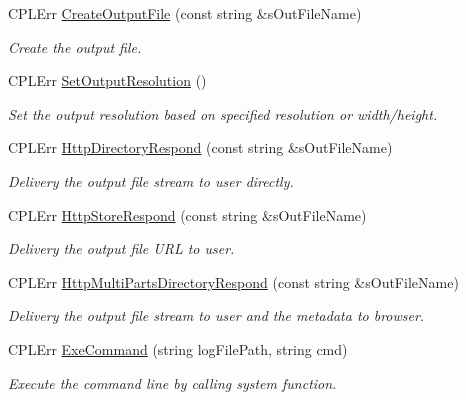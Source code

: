 \begin{DoxyCompactItemize}
\item 
CPLErr \hyperlink{classWCS__GetCoverage_a38ebb99c11736874a5fdf9898aa3ce7f}{CreateOutputFile} (const string \&sOutFileName)
\begin{DoxyCompactList}\small\item\em Create the output file. \end{DoxyCompactList}\item 
CPLErr \hyperlink{classWCS__GetCoverage_a32d3c6edbb677534e0036c4acb6a327c}{SetOutputResolution} ()
\begin{DoxyCompactList}\small\item\em Set the output resolution based on specified resolution or width/height. \end{DoxyCompactList}\item 
CPLErr \hyperlink{classWCS__GetCoverage_a890b915a63bc56d6057981527d3f680e}{HttpDirectoryRespond} (const string \&sOutFileName)
\begin{DoxyCompactList}\small\item\em Delivery the output file stream to user directly. \end{DoxyCompactList}\item 
CPLErr \hyperlink{classWCS__GetCoverage_a1e8c186ce55e8f06e60681334dd38715}{HttpStoreRespond} (const string \&sOutFileName)
\begin{DoxyCompactList}\small\item\em Delivery the output file URL to user. \end{DoxyCompactList}\item 
CPLErr \hyperlink{classWCS__GetCoverage_aed557090f7ea436d261959393f878e32}{HttpMultiPartsDirectoryRespond} (const string \&sOutFileName)
\begin{DoxyCompactList}\small\item\em Delivery the output file stream to user and the metadata to browser. \end{DoxyCompactList}\item 
CPLErr \hyperlink{classWCS__GetCoverage_a3d3409267ed54560783523097a75f966}{ExeCommand} (string logFilePath, string cmd)
\begin{DoxyCompactList}\small\item\em Execute the command line by calling system function. \end{DoxyCompactList}\end{DoxyCompactItemize}
